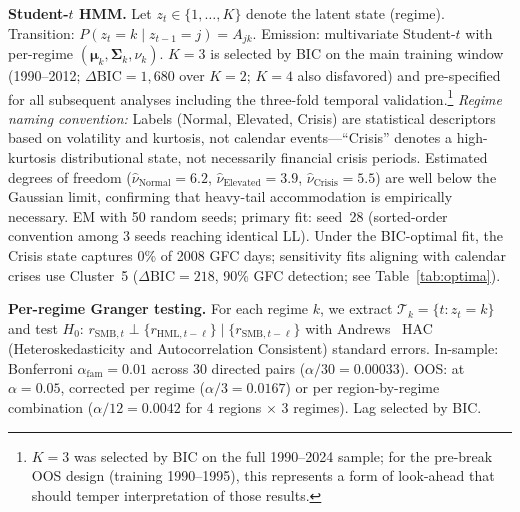 \documentclass[sigconf,anonymous]{acmart}
\begin{document}
\textbf{Student-$t$ HMM.}
Let $z_t \in \{1, \ldots, K\}$ denote the latent state (regime).
Transition: $P(z_t = k \mid z_{t-1} = j) = A_{jk}$.
Emission: multivariate Student-$t$ with per-regime
$(\boldsymbol{\mu}_k, \boldsymbol{\Sigma}_k, \nu_k)$.
$K = 3$ is selected by BIC on the main training window (1990--2012;
$\Delta\text{BIC} = 1{,}680$ over $K = 2$; $K = 4$ also disfavored)
and pre-specified for all subsequent analyses including the three-fold
temporal validation.\footnote{$K=3$ was selected by BIC on the full 1990--2024
sample; for the pre-break OOS design (training 1990--1995), this represents
a form of look-ahead that should temper interpretation of those results.}
\emph{Regime naming convention:} Labels (Normal, Elevated, Crisis) are
statistical descriptors based on volatility and kurtosis, not calendar
events---``Crisis'' denotes a high-kurtosis distributional state, not
necessarily financial crisis periods.
Estimated degrees of freedom
($\hat{\nu}_{\text{Normal}} = 6.2$, $\hat{\nu}_{\text{Elevated}} = 3.9$,
$\hat{\nu}_{\text{Crisis}} = 5.5$) are well below the Gaussian limit,
confirming that heavy-tail accommodation is empirically necessary.
EM with 50 random seeds; primary fit: seed~28
(sorted-order convention among 3 seeds reaching identical LL).
Under the BIC-optimal fit, the Crisis state captures 0\% of 2008 GFC
days; sensitivity fits aligning with calendar crises use Cluster~5
($\Delta\text{BIC} = 218$, 90\% GFC detection; see Table~\ref{tab:optima}).

\textbf{Per-regime Granger testing.}
For each regime $k$, we extract $\mathcal{T}_k = \{t : \hat{z}_t = k\}$
and test
$H_0$: $r_{\text{SMB},t} \perp \{r_{\text{HML},t-\ell}\} \mid \{r_{\text{SMB},t-\ell}\}$
with Andrews~\cite{andrews1991heteroskedasticity} HAC
(Heteroskedasticity and Autocorrelation Consistent) standard errors.
In-sample: Bonferroni $\alpha_{\text{fam}} = 0.01$ across 30 directed pairs
($\alpha/30 = 0.00033$). OOS: at $\alpha = 0.05$, corrected per regime
($\alpha/3 = 0.0167$) or per region-by-regime combination
($\alpha/12 = 0.0042$ for 4 regions $\times$ 3 regimes). Lag selected by BIC.
\end{document}
